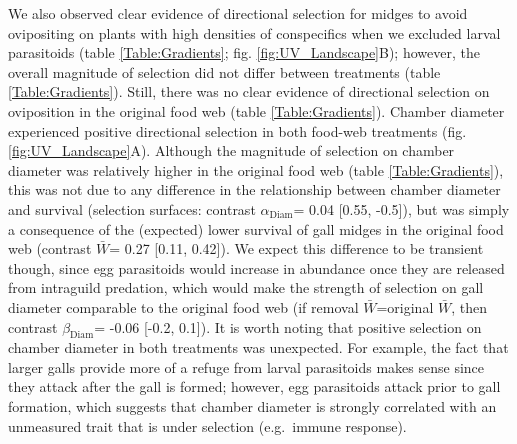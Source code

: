 \documentclass[11pt,]{article}
\begin{document}
We also observed clear evidence of directional selection for midges to
avoid ovipositing on plants with high densities of conspecifics when we
excluded larval parasitoids (table \ref{Table:Gradients}; fig.
\ref{fig:UV_Landscape}B); however, the overall magnitude of selection
did not differ between treatments (table \ref{Table:Gradients}). Still,
there was no clear evidence of directional selection on oviposition in
the original food web (table \ref{Table:Gradients}). Chamber diameter
experienced positive directional selection in both food-web treatments
(fig. \ref{fig:UV_Landscape}A). Although the magnitude of selection on
chamber diameter was relatively higher in the original food web (table
\ref{Table:Gradients}), this was not due to any difference in the
relationship between chamber diameter and survival (selection surfaces:
contrast \(\alpha_{\text{Diam}}\)= 0.04 {[}0.55, -0.5{]}), but was
simply a consequence of the (expected) lower survival of gall midges in
the original food web (contrast \(\bar W\)= 0.27 {[}0.11, 0.42{]}). We
expect this difference to be transient though, since egg parasitoids
would increase in abundance once they are released from intraguild
predation, which would make the strength of selection on gall diameter
comparable to the original food web (if removal \(\bar W\)=original
\(\bar W\), then contrast \(\beta_{\text{Diam}}\)= -0.06 {[}-0.2,
0.1{]}). It is worth noting that positive selection on chamber diameter
in both treatments was unexpected. For example, the fact that larger
galls provide more of a refuge from larval parasitoids makes sense since
they attack after the gall is formed; however, egg parasitoids attack
prior to gall formation, which suggests that chamber diameter is
strongly correlated with an unmeasured trait that is under selection
(e.g.~immune response).

\bigskip
\end{document}

